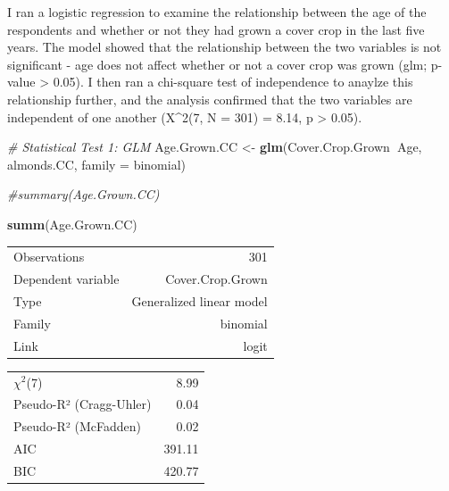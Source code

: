 \documentclass[12pt,]{article}
\newenvironment{Shaded}{\begin{snugshade}}{\end{snugshade}}
\newcommand{\KeywordTok}[1]{\textcolor[rgb]{0.13,0.29,0.53}{\textbf{#1}}}
\newcommand{\DataTypeTok}[1]{\textcolor[rgb]{0.13,0.29,0.53}{#1}}
\newcommand{\StringTok}[1]{\textcolor[rgb]{0.31,0.60,0.02}{#1}}
\newcommand{\CommentTok}[1]{\textcolor[rgb]{0.56,0.35,0.01}{\textit{#1}}}
\newcommand{\OperatorTok}[1]{\textcolor[rgb]{0.81,0.36,0.00}{\textbf{#1}}}
\newcommand{\NormalTok}[1]{#1}
\begin{document}
\FloatBarrier

I ran a logistic regression to examine the relationship between the age
of the respondents and whether or not they had grown a cover crop in the
last five years. The model showed that the relationship between the two
variables is not significant - age does not affect whether or not a
cover crop was grown (glm; p-value \textgreater{} 0.05). I then ran a
chi-square test of independence to anaylze this relationship further,
and the analysis confirmed that the two variables are independent of one
another (X\^{}2(7, N = 301) = 8.14, p \textgreater{} 0.05).

\begin{Shaded}
\begin{Highlighting}[]
\CommentTok{# Statistical Test 1: GLM}
\NormalTok{Age.Grown.CC <-}\StringTok{ }\KeywordTok{glm}\NormalTok{(Cover.Crop.Grown}\OperatorTok{~}\NormalTok{Age, almonds.CC, }\DataTypeTok{family =}\NormalTok{ binomial)}

\CommentTok{#summary(Age.Grown.CC)}

\KeywordTok{summ}\NormalTok{(Age.Grown.CC)}
\end{Highlighting}
\end{Shaded}

\begin{table}[!h]
\centering
\begin{tabular}{lr}
\toprule
\rowcolor{gray!6}  Observations & 301\\
Dependent variable & Cover.Crop.Grown\\
\rowcolor{gray!6}  Type & Generalized linear model\\
Family & binomial\\
\rowcolor{gray!6}  Link & logit\\
\bottomrule
\end{tabular}
\end{table}

\begin{table}[!h]
\centering
\begin{tabular}{lr}
\toprule
\rowcolor{gray!6}  $\chi^2$(7) & 8.99\\
Pseudo-R² (Cragg-Uhler) & 0.04\\
\rowcolor{gray!6}  Pseudo-R² (McFadden) & 0.02\\
AIC & 391.11\\
\rowcolor{gray!6}  BIC & 420.77\\
\bottomrule
\end{tabular}
\end{table}
\end{document}
